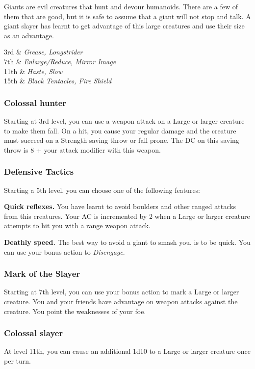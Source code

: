 Giants are evil creatures that hunt and devour humanoids. There are a few of them that are good, but it is safe to assume that a giant will not stop and talk. A giant slayer has learnt to get advantage of this large creatures and use their size as an advantage.

\begin{archetypespells}
	3rd & \textit{Grease, Longstrider} \\
	7th & \textit{Enlarge/Reduce, Mirror Image} \\
	11th & \textit{Haste, Slow}\\
	15th & \textit{Black Tentacles, Fire Shield}\\
\end{archetypespells}

\subsubsection*{Colossal hunter}
Starting at 3rd level, you can use a weapon attack on a Large or larger creature to make them fall. On a hit, you cause your regular damage and the creature must succeed on a Strength saving throw or fall prone. The DC on this saving throw is 8 + your attack modifier with this weapon.
\subsubsection*{Defensive Tactics}
Starting a 5th level, you can choose one of the following features:

\textbf{Quick reflexes.} You have learnt to avoid boulders and other ranged attacks from this creatures. Your AC is incremented by 2 when a Large or larger creature attempts to hit you with a range weapon attack.

\textbf{Deathly speed.} The best way to avoid a giant to smash you, is to be quick. You can use your bonus action to \textit{Disengage}.
\subsubsection*{Mark of the Slayer}
Starting at 7th level, you can use your bonus action to mark a Large or larger creature. You and your friends have advantage on weapon attacks against the creature. You point the weaknesses of your foe.
\subsubsection*{Colossal slayer}
At level 11th, you can cause an additional 1d10 to a Large or larger creature once per turn.